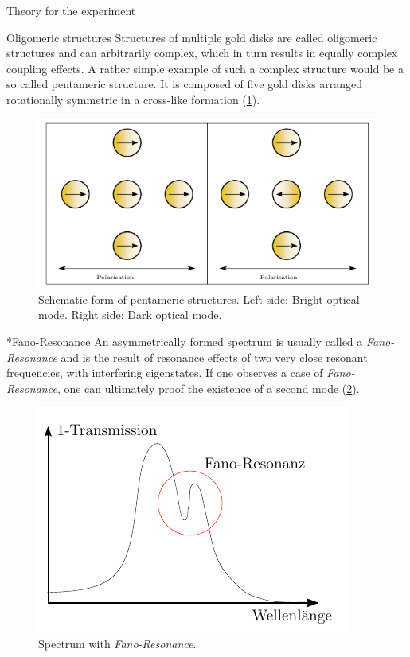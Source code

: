 \documentclass[pdftex, a4paper,11pt, twoside, UKenglish]{report}
\begin{document}
\begin{chapter}{Theory for the experiment}
    
    
    \begin{section}{Oligomeric structures}
      \label{chp:TheoryOligomerics}
      Structures of multiple gold disks are called oligomeric structures and can
      arbitrarily complex, which in turn results in equally complex coupling
      effects. A rather simple example of such a complex structure would be a
      so called pentameric structure. It is composed of five gold disks arranged
      rotationally symmetric in a cross-like formation (\cref{fig:Pentamers}).
      \begin{figure}[ht]
        \centering
        \includegraphics[width=.9\textwidth]{Figures/Pentamers.png}
        \caption{Schematic form of pentameric structures.
            Left side: Bright optical mode. Right side: Dark optical mode.}
        \label{fig:Pentamers}
      \end{figure}
      
      
      
      \begin{subsection}*{Fano-Resonance}
        An asymmetrically formed spectrum is usually called a
        \textit{Fano-Resonance} and is the result of resonance effects of
        two very close resonant frequencies, with interfering eigenstates.
        If one observes a case of \textit{Fano-Resonance}, one can
        ultimately proof the existence of a second mode (\cref{fig:Fano}).
        \begin{figure}[ht!]
          \centering
          \includegraphics[width=.55\textwidth]{Figures/Fano.png}
          \caption{Spectrum with \textit{Fano-Resonance}.}
          \label{fig:Fano}
        \end{figure}
      \end{subsection}
      

\end{section}
\end{chapter}
\end{document}
